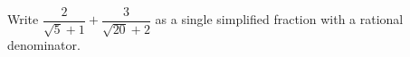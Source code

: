 Write $\dfrac{2}{\sqrt5+1}+\dfrac{3}{\sqrt{20}+2}$ as a single simplified fraction with a rational denominator.
